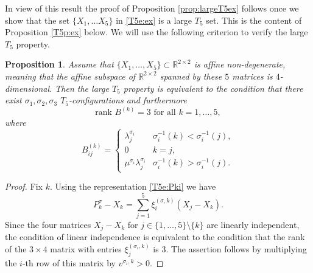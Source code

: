 \documentclass[titlepage]{amsart}
\numberwithin{equation}{section}
\theoremstyle{plain}
\newtheorem{proposition}[equation]{Proposition}
\theoremstyle{definition}
\theoremstyle{remark}
\newcommand{\R}{\mathbb{R}}
\begin{document}
In view of this result the proof of Proposition \ref{prop:largeT5ex} follows once we show 
that the set $\{X_1,\dots X_5\}$ in \eqref{T5e:ex} is a large $T_5$ set. This is the content of Proposition \ref{T5p:ex} below. 
We will use the following criterion to verify the large $T_5$ property.

 
\begin{proposition} \label{pr:criterion_rank3}  Assume that $\{X_1,\dots,X_5\}\subset\R^{2\times 2}$ is affine non-degenerate, meaning that the affine subspace of $\R^{2\times 2}$ spanned by these $5$ matrices is $4$-dimensional. Then the large $T_5$ property is 
equivalent to the condition that there exist $\sigma_1,\sigma_2,\sigma_3$ $T_5$-configurations and furthermore 
\begin{equation}\label{T5e:rank}
	\textrm{rank }B^{(k)}=3\textrm{ for all }k=1,\dots,5,
\end{equation}
where
$$
B^{(k)}_{ij}=\begin{cases} \lambda_j^{\sigma_i}& \sigma_i^{-1}(k)<\sigma_i^{-1}(j),\\
0&k=j,\\
\mu^{\sigma_i}\lambda_j^{\sigma_i}&	\sigma_i^{-1}(k)>\sigma_i^{-1}(j).\end{cases}
$$
\end{proposition}

\begin{proof} Fix $k$.    
Using the representation \eqref{T5e:Pki} we have
$$
P_k^\sigma-X_k=\sum_{j=1}^5  \xi^{(\sigma, k)}_i (X_j-X_k).$$
Since the  four matrices $X_j - X_k$ for $j \in \{ 1, \ldots,  5\} \setminus \{k\}$ are linearly independent,
the condition of linear independence is equivalent to the condition that the rank of the $3 \times 4$ matrix with entries
$\xi^{(\sigma_i, k)}_j$ is $3$. The assertion follows by  multiplying the $i$-th row of this matrix by $v^{\sigma_i,k} > 0$.
\end{proof}
\end{document}
